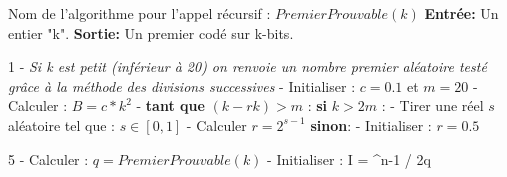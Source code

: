 \documentclass[a4paper,11pt]{article}
\renewcommand{\algorithmicrequire}{\textbf{Entrée:}}
\renewcommand{\algorithmicensure}{\textbf{Sortie:}}
\renewcommand{\algorithmicif}{\textbf{si}}
\renewcommand{\algorithmicelse}{\textbf{sinon}}
\renewcommand{\algorithmicwhile}{\textbf{tant que}}
\begin{document}
\begin{algorithm}[H]
\SetAlgoLined
\newline\newline
Nom de l'algorithme pour l'appel récursif : \newline
\hspace*{5mm}  $PremierProuvable(k)$ \newline
\newline
\algorithmicrequire{ Un entier "k".}\newline
\algorithmicensure{ Un premier codé sur k-bits.}\newline

 1 - \emph{Si k est petit (inférieur à 20) on renvoie un nombre premier aléatoire testé grâce à la méthode des divisions successives } - Initialiser : $c = 0.1$ et $m=20$  - Calculer : $B = c * k^2$  - \algorithmicwhile{ $(k - rk) > m $ :} \newline
 \hspace*{10mm} \algorithmicif{ $k > 2m$ :}\newline
 \hspace*{20mm} - Tirer une réel $s$ aléatoire tel que : $ s \in [0,1] $      \newline
 \hspace*{20mm} - Calculer $r = 2^{s-1}$ \newline
 \hspace*{10mm} \algorithmicelse : \newline
 \hspace*{20mm} - Initialiser :  $r = 0.5$
 
 5 - Calculer : $q = PremierProuvable(k)$  - Initialiser : I = ^{n-1} / 2q \rfloor \newline 
 

\end{algorithm}
\end{document}
